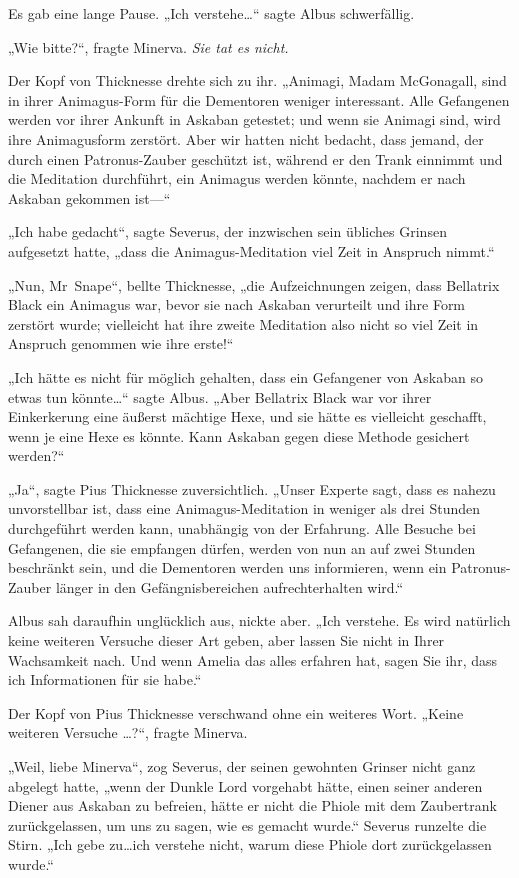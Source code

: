 {Es gab eine lange Pause. „Ich verstehe…“ sagte Albus schwerfällig.

„Wie bitte?“, fragte Minerva. \emph{Sie tat es nicht.}

Der Kopf von Thicknesse drehte sich zu ihr. „Animagi, Madam McGonagall, sind in ihrer Animagus-Form für die Dementoren weniger interessant. Alle Gefangenen werden vor ihrer Ankunft in Askaban getestet; und wenn sie Animagi sind, wird ihre Animagusform zerstört. Aber wir hatten nicht bedacht, dass jemand, der durch einen Patronus-Zauber geschützt ist, während er den Trank einnimmt und die Meditation durchführt, ein Animagus werden könnte, nachdem er nach Askaban gekommen ist—“

„Ich habe gedacht“, sagte Severus, der inzwischen sein übliches Grinsen aufgesetzt hatte, „dass die Animagus-Meditation viel Zeit in Anspruch nimmt.“

„Nun, Mr~Snape“, bellte Thicknesse, „die Aufzeichnungen zeigen, dass Bellatrix Black ein Animagus war, bevor sie nach Askaban verurteilt und ihre Form zerstört wurde; vielleicht hat ihre zweite Meditation also nicht so viel Zeit in Anspruch genommen wie ihre erste!“

„Ich hätte es nicht für möglich gehalten, dass ein Gefangener von Askaban so etwas tun könnte…“ sagte Albus. „Aber Bellatrix Black war vor ihrer Einkerkerung eine äußerst mächtige Hexe, und sie hätte es vielleicht geschafft, wenn je eine Hexe es könnte. Kann Askaban gegen diese Methode gesichert werden?“

„Ja“, sagte Pius Thicknesse zuversichtlich. „Unser Experte sagt, dass es nahezu unvorstellbar ist, dass eine Animagus-Meditation in weniger als drei Stunden durchgeführt werden kann, unabhängig von der Erfahrung. Alle Besuche bei Gefangenen, die sie empfangen dürfen, werden von nun an auf zwei Stunden beschränkt sein, und die Dementoren werden uns informieren, wenn ein Patronus-Zauber länger in den Gefängnisbereichen aufrechterhalten wird.“

Albus sah daraufhin unglücklich aus, nickte aber. „Ich verstehe. Es wird natürlich keine weiteren Versuche dieser Art geben, aber lassen Sie nicht in Ihrer Wachsamkeit nach. Und wenn Amelia das alles erfahren hat, sagen Sie ihr, dass ich Informationen für sie habe.“

Der Kopf von Pius Thicknesse verschwand ohne ein weiteres Wort. „Keine weiteren Versuche …?“, fragte Minerva.

„Weil, liebe Minerva“, zog Severus, der seinen gewohnten Grinser nicht ganz abgelegt hatte, „wenn der Dunkle Lord vorgehabt hätte, einen seiner anderen Diener aus Askaban zu befreien, hätte er nicht die Phiole mit dem Zaubertrank zurückgelassen, um uns zu sagen, wie es gemacht wurde.“ Severus runzelte die Stirn. „Ich gebe zu…ich verstehe nicht, warum diese Phiole dort zurückgelassen wurde.“

}
